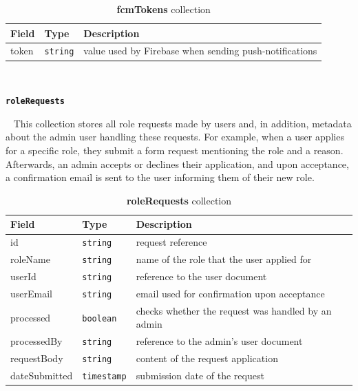 \begin{table}[th]\small\linespread{1}
    \centering
    \caption{\textbf{fcmTokens} collection}
    \label{5:tab:users}
    \begin{tabular}{| p{3.5cm} | p{2.7cm} | p{6.1cm} |}
    \hline
    \textbf{Field} & \textbf{Type} & \textbf{Description} \\
    \hline
    token & \texttt{string} & value used by Firebase when sending push-notifications
    \\
    \hline
    \end{tabular}
\end{table}

~

\faDatabase \hspace{0.1cm} \textbf{\texttt{roleRequests}}

~
This collection stores all role requests made by users and, in addition, metadata about the admin user handling these requests. For example, when a user applies for a specific role, they submit a form request mentioning the role and a reason. Afterwards, an admin accepts or declines their application, and upon acceptance, a confirmation email is sent to the user informing them of their new role. 
~

\begin{table}[th]\small\linespread{1}
    \centering
    \caption{\textbf{roleRequests} collection}
    \label{5:tab:users}
    \begin{tabular}{| p{3.5cm} | p{2.7cm} | p{6cm} |}
    \hline
    \textbf{Field} & \textbf{Type} & \textbf{Description} \\
    \hline
    id & \texttt{string} & request reference
    \\
    \hline
    roleName & \texttt{string} & name of the role that the user applied for
    \\
    \hline
    userId & \texttt{string} & reference to the user document
    \\
    \hline
    userEmail & \texttt{string} & email used for confirmation upon acceptance
    \\
    \hline
    processed & \texttt{boolean} & checks whether the request was handled by an admin
    \\
    \hline
    processedBy & \texttt{string} & reference to the admin's user document
    \\
    \hline
    requestBody & \texttt{string} & content of the request application
    \\
    \hline
    dateSubmitted & \texttt{timestamp} & submission date of the request
    \\
    \hline
    \end{tabular}
\end{table}


